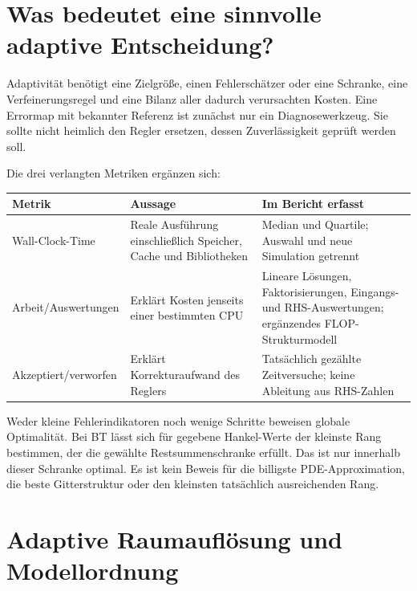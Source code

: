 \documentclass[11pt,a4paper]{article}
\begin{document}
\section{Was bedeutet eine sinnvolle adaptive Entscheidung?}
Adaptivität benötigt eine Zielgröße, einen Fehlerschätzer oder eine Schranke, eine Verfeinerungsregel und eine Bilanz aller dadurch verursachten Kosten. Eine Errormap mit bekannter Referenz ist zunächst nur ein Diagnosewerkzeug. Sie sollte nicht heimlich den Regler ersetzen, dessen Zuverlässigkeit geprüft werden soll.

Die drei verlangten Metriken ergänzen sich:
\begin{table}[htbp]\centering\small
\begin{tabularx}{\linewidth}{>{\raggedright\arraybackslash}p{36mm}>{\raggedright\arraybackslash}X>{\raggedright\arraybackslash}X}\toprule
Metrik & Aussage & Im Bericht erfasst\\\midrule
Wall-Clock-Time & Reale Ausführung einschließlich Speicher, Cache und Bibliotheken & Median und Quartile; Auswahl und neue Simulation getrennt\\
Arbeit/Auswertungen & Erklärt Kosten jenseits einer bestimmten CPU & Lineare Lösungen, Faktorisierungen, Eingangs- und RHS-Auswertungen; ergänzendes FLOP-Strukturmodell\\
Akzeptiert/verworfen & Erklärt Korrekturaufwand des Reglers & Tatsächlich gezählte Zeitversuche; keine Ableitung aus RHS-Zahlen\\\bottomrule
\end{tabularx}
\end{table}

Weder kleine Fehlerindikatoren noch wenige Schritte beweisen globale Optimalität. Bei BT lässt sich für gegebene Hankel-Werte der kleinste Rang bestimmen, der die gewählte Restsummenschranke erfüllt. Das ist nur innerhalb dieser Schranke optimal. Es ist kein Beweis für die billigste PDE-Approximation, die beste Gitterstruktur oder den kleinsten tatsächlich ausreichenden Rang.

\section{Adaptive Raumauflösung und Modellordnung}
\end{document}

